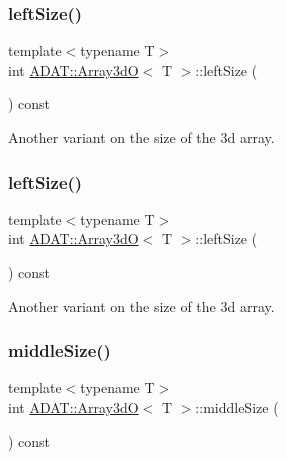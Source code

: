 \subsubsection{\texorpdfstring{leftSize()}{leftSize()}\hspace{0.1cm}{\footnotesize\ttfamily [1/2]}}
{\footnotesize\ttfamily template$<$typename T$>$ \\
int \mbox{\hyperlink{classADAT_1_1Array3dO}{A\+D\+A\+T\+::\+Array3dO}}$<$ T $>$\+::left\+Size (\begin{DoxyParamCaption}{ }\end{DoxyParamCaption}) const\hspace{0.3cm}{\ttfamily [inline]}}



Another variant on the size of the 3d array. 

\mbox{\label{classADAT_1_1Array3dO_a60f0fb62e8b93e6828fc98df271db054}} 
\subsubsection{\texorpdfstring{leftSize()}{leftSize()}\hspace{0.1cm}{\footnotesize\ttfamily [2/2]}}
{\footnotesize\ttfamily template$<$typename T$>$ \\
int \mbox{\hyperlink{classADAT_1_1Array3dO}{A\+D\+A\+T\+::\+Array3dO}}$<$ T $>$\+::left\+Size (\begin{DoxyParamCaption}{ }\end{DoxyParamCaption}) const\hspace{0.3cm}{\ttfamily [inline]}}



Another variant on the size of the 3d array. 

\mbox{\label{classADAT_1_1Array3dO_aff38cae908364701dc0fefd386223c55}} 
\subsubsection{\texorpdfstring{middleSize()}{middleSize()}\hspace{0.1cm}{\footnotesize\ttfamily [1/2]}}
{\footnotesize\ttfamily template$<$typename T$>$ \\
int \mbox{\hyperlink{classADAT_1_1Array3dO}{A\+D\+A\+T\+::\+Array3dO}}$<$ T $>$\+::middle\+Size (\begin{DoxyParamCaption}{ }\end{DoxyParamCaption}) const\hspace{0.3cm}{\ttfamily [inline]}}

